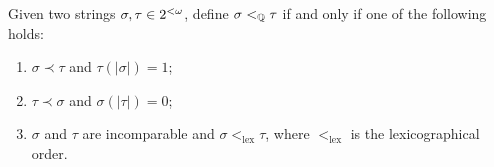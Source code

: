\begin{comment}
  Now, by Theorem 2.44 of \pelliot{cite ludo's paper} applied to both $h_0$ and $h_1$, we get $D_0$ and two colors, one per embedding type. We split in cases.
  \begin{enumerate}
  \item If $i^j_s=i_\infty$ for some $j<2$. Then, we will do the same kind of construction as in the first paragraph.
  \item Otherwise, $i^0_s=i_\Qb$ and $i^1_s=i_\Qb$. Then, let $S=\{\emptyset'_s\uh \ell:\ell\in\meetlevel\sigma\tau\}$
  \end{enumerate}


  \begin{enumerate}
  \item ...
  \item ...
  \end{enumerate}
  Now, we consider the following cases:

 \medskip
 \noindent \emph{Case 1: there exists an embedding type such that $i_\ell=i_\infty$ and $i_s=i_\Qb$.}
 In this case, we define $\{\sigma_s:...\}$.
 Symmetric to Case 2.

 \medskip
 \noindent \emph{Case 2: for all embedding type, $i_\ell=i_\Qb$ and $i_s=i_\infty$.} Symmetric to Case 1.
\end{proof}
\end{comment}

\begin{definition}\label{def:leq-Q}\index{$<_\Qb$}
  Given two strings $\sigma,\tau\in{2^{<\omega}}$, define $\sigma<_{\mathbb{Q}}\tau$ if and only if one of the following holds:
  \begin{enumerate}
  \item $\sigma\prec\tau$ and $\tau(|\sigma|)=1$;
  \item $\tau\prec\sigma$ and $\sigma(|\tau|)=0$;
  \item $\sigma$ and $\tau$ are incomparable and $\sigma<_{\mathrm{lex}}\tau$, where $<_{\mathrm{lex}}$ is the lexicographical order.
  \end{enumerate}
\end{definition}

